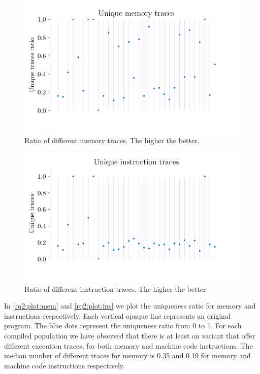 \documentclass[sigplan,screen]{acmart}
\begin{document}
\begin{figure}
    \centering
    \includegraphics[width=\linewidth]{plots/rq2/memory.pdf}
    \caption{Ratio of different memory traces. The higher the better.}
  \label{rq2:plot:mem}
\end{figure}

\begin{figure}
    \centering
    \includegraphics[width=\linewidth]{plots/rq2/instructions.pdf}
    \caption{Ratio of different instruction traces. The higher the better.}
  \label{rq2:plot:ins}
\end{figure}




In \autoref{rq2:plot:mem} and \autoref{rq2:plot:ins} we plot the uniqueness ratio for memory and instructions respectively.
Each vertical opaque line represents an original program.
The blue dots represent the uniqueness ratio from 0 to 1.
For each compiled population we have observed that there is at least on variant that offer different execution traces, for both memory and machine code instructions.
The median number of different traces for memory is 0.35 and 0.19 for memory and machine code instructions respectively.
\end{document}
